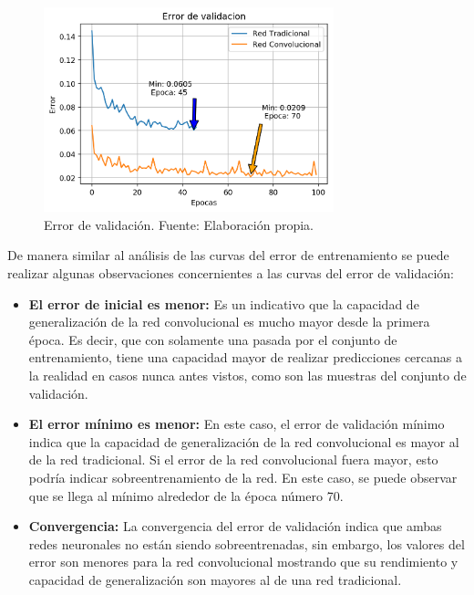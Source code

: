         \begin{figure}[!ht] 
            \centering
            \includegraphics[width=0.75\textwidth]{img/valloss}
            \caption[Error de validación]{Error de validación. Fuente: Elaboración propia. }
            \label{fig:valloss}
        \end{figure}
        
        De manera similar al análisis de las curvas del error de entrenamiento se puede realizar algunas observaciones concernientes
        a las curvas del error de validación:

        \begin{itemize}
            \item \textbf{El error de inicial es menor:} Es un indicativo que la capacidad de generalización de la red convolucional 
            es mucho mayor desde la primera época. Es decir, que con solamente una pasada por el conjunto de entrenamiento, tiene una 
            capacidad mayor de realizar predicciones cercanas a la realidad en casos nunca antes vistos, como son las muestras del
            conjunto de validación.
            \item \textbf{El error mínimo es menor:} En este caso, el error de validación mínimo indica que la capacidad de generalización 
            de la red convolucional es mayor al de la red tradicional. Si el error de la red convolucional fuera mayor, esto podría indicar 
            sobreentrenamiento de la red. En este caso, se puede observar que se llega al mínimo alrededor de la época número 70.
            \item \textbf{Convergencia:} La convergencia del error de validación indica que ambas redes neuronales no están siendo 
            sobreentrenadas, sin embargo, los valores del error son menores para la red convolucional mostrando que su rendimiento 
            y capacidad de generalización son mayores al de una red tradicional.
        \end{itemize}
    
